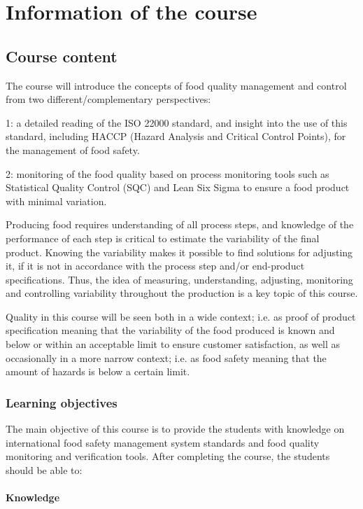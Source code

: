 \chapter{Information of the course}

\section{Course content}

The course will introduce the concepts of food quality management and control from two different/complementary perspectives: 

1: a detailed reading of the ISO 22000 standard, and insight into the use of this standard, including HACCP (Hazard Analysis and Critical Control Points), for the management of food safety. 

2: monitoring of the food quality based on process monitoring tools such as Statistical Quality Control (SQC) and Lean Six Sigma to ensure a food product with minimal variation.

Producing food requires understanding of all process steps, and knowledge of the performance of each step is critical to estimate the variability of the final product. Knowing the variability makes it possible to find solutions for adjusting it, if it is not in accordance with the process step and/or end-product specifications. Thus, the idea of measuring, understanding, adjusting, monitoring and controlling variability throughout the production is a key topic of this course.

Quality in this course will be seen both in a wide context; i.e. as proof of product specification meaning that the variability of the food produced is known and below or within an acceptable limit to ensure customer satisfaction, as well as occasionally in a more narrow context; i.e. as food safety meaning that the amount of hazards is below a certain limit.

\subsection{Learning objectives}

The main objective of this course is to provide the students with knowledge on international food safety management system standards and food quality monitoring and verification tools. After completing the course, the students should be able to:

\subsubsection{Knowledge}

